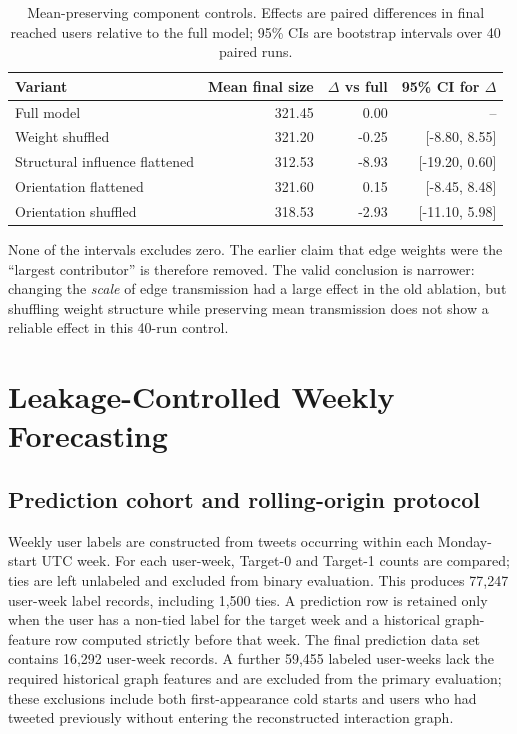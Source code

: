 \documentclass[11pt,a4paper]{article}
\begin{document}
\begin{table}[H]
\centering
\small
\caption{Mean-preserving component controls. Effects are paired differences in final reached users relative to the full model; 95\% CIs are bootstrap intervals over 40 paired runs.}
\label{tab:ablation}
\begin{tabular}{lrrr}
\toprule
Variant & Mean final size & $\Delta$ vs full & 95\% CI for $\Delta$\\
\midrule
Full model & 321.45 & 0.00 & --\\
Weight shuffled & 321.20 & -0.25 & [-8.80, 8.55]\\
Structural influence flattened & 312.53 & -8.93 & [-19.20, 0.60]\\
Orientation flattened & 321.60 & 0.15 & [-8.45, 8.48]\\
Orientation shuffled & 318.53 & -2.93 & [-11.10, 5.98]\\
\bottomrule
\end{tabular}
\end{table}

None of the intervals excludes zero. The earlier claim that edge weights were the ``largest contributor'' is therefore removed. The valid conclusion is narrower: changing the \emph{scale} of edge transmission had a large effect in the old ablation, but shuffling weight structure while preserving mean transmission does not show a reliable effect in this 40-run control.

\section{Leakage-Controlled Weekly Forecasting}
\subsection{Prediction cohort and rolling-origin protocol}
Weekly user labels are constructed from tweets occurring within each Monday-start UTC week. For each user-week, Target-0 and Target-1 counts are compared; ties are left unlabeled and excluded from binary evaluation. This produces 77,247 user-week label records, including 1,500 ties. A prediction row is retained only when the user has a non-tied label for the target week and a historical graph-feature row computed strictly before that week. The final prediction data set contains 16,292 user-week records. A further 59,455 labeled user-weeks lack the required historical graph features and are excluded from the primary evaluation; these exclusions include both first-appearance cold starts and users who had tweeted previously without entering the reconstructed interaction graph.
\end{document}
